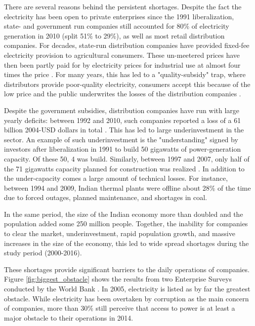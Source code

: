 \documentclass[11pt]{article}
\begin{document}
There are several reasons behind the persistent shortages. Despite the fact the electricity has been open to private enterprises since the 1991 liberalization, state- and government run companies still accounted for 80\% of electricity generation in 2010 (split 51\% to 29\%), as well as most retail distribution companies. For decades, state-run distribution companies have provided fixed-fee electricity provision to agricultural consumers. These un-meetered prices have then been partly paid for by electricity prices for industrial use at almost four times the price \citep{allcott_how_2016}. For many years, this has led to a "quality-subsidy" trap, where distributors provide poor-quality electricity, consumers accept this because of the low price and the public underwrites the losses of the distribution companies \citep{mcrae_infrastructure_2015}. 

Despite the government subsidies, distribution companies have run with large yearly deficits: between 1992 and 2010, such companies reported a loss of a 61 billion 2004-USD dollars in total \citep{allcott_how_2016}. This has led to large underinvestment in the sector. An example of such underinvestment is the "understanding" signed by investors after liberalization in 1991 to build 50 gigawatts of power-generation capacity. Of these 50, 4 was build. Similarly, between 1997 and 2007, only half of the 71 gigawatts capacity planned for construction was realized \citep{cea_planwise_2013}. In addition to the under-capacity comes a large amount of technical losses. For instance, between 1994 and 2009, Indian thermal plants were offline about 28\% of the time due to forced outages, planned maintenance, and shortages in coal. 

In the same period, the size of the Indian economy more than doubled and the population added some 250 million people. Together, the inability for companies to clear the market, underinvestment, rapid population growth, and massive increases in the size of the economy, this led to wide spread shortages during the study period (2000-2016). 

These shortages provide significant barriers to the daily operations of companies. Figure \ref{fig:biggest_obstacle} shows the results from two Enterprise Surveys conducted by the World Bank \citep{world_bank_enterprise_2020-1,world_bank_enterprise_2020-2}. In 2005, electricity is listed as by far the greatest obstacle. While electricity has been overtaken by corruption as the main concern of companies, more than 30\% still perceive that access to power is at least a major obstacle to their operations in 2014.
\end{document}

